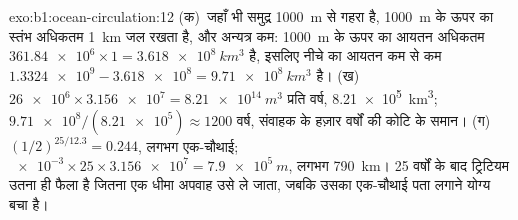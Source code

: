 \begin{solution}{exo:b1:ocean-circulation:12}
(क)~जहाँ भी समुद्र \qty{1000}{m} से गहरा है, \qty{1000}{m} के ऊपर का स्तंभ अधिकतम \qty{1}{km} जल रखता है, और अन्यत्र कम: \qty{1000}{m} के ऊपर का आयतन अधिकतम $\num{361.84e6} \times 1 = \qty{3.618e8}{km^3}$ है, इसलिए नीचे का आयतन कम से कम $\num{1.3324e9} - \num{3.618e8} = \qty{9.71e8}{km^3}$ है। (ख)~$\num{26e6} \times \num{3.156e7} = \qty{8.21e14}{m^3}$ प्रति वर्ष, \qty{8.21e5}{km^3}; $\num{9.71e8}/(\num{8.21e5}) \approx 1200$ वर्ष, संवाहक के हज़ार वर्षों की कोटि के समान। (ग)~$(1/2)^{25/12.3} = 0.244$, लगभग एक-चौथाई; $\num{e-3} \times 25 \times \num{3.156e7} = \qty{7.9e5}{m}$, लगभग \qty{790}{km}। 25 वर्षों के बाद ट्रिटियम उतना ही फैला है जितना एक धीमा अपवाह उसे ले जाता, जबकि उसका एक-चौथाई पता लगाने योग्य बचा है।
\end{solution}

